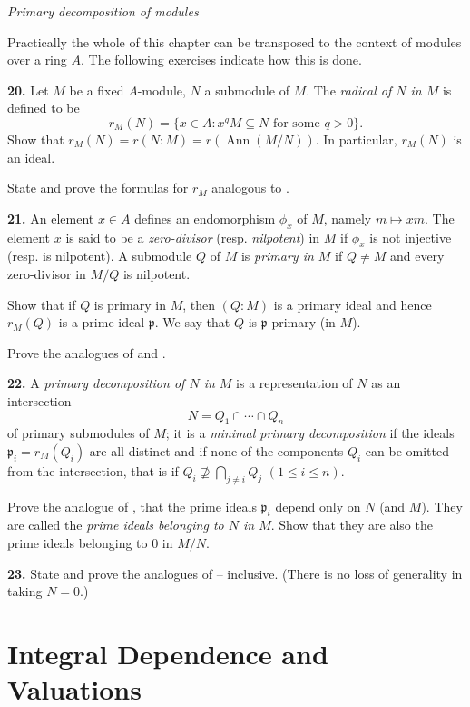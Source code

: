 \medskip
\noindent\emph{Primary decomposition of modules}

Practically the whole of this chapter can be transposed to the context of
modules over a ring $A$.  The following exercises indicate how this is done.

\medskip
\noindent\textbf{20.} Let $M$ be a fixed $A$-module, $N$ a submodule of $M$.  The \emph{radical of $N$ in $M$} is
defined to be
\[
r_M(N)=\{x\in A:x^qM\subseteq N\text{ for some }q>0\}.
\]
Show that $r_M(N)=r(N:M)=r(\operatorname{Ann}(M/N))$.  In particular, $r_M(N)$ is an
ideal.

State and prove the formulas for $r_M$ analogous to .

\medskip
\noindent\textbf{21.} An element $x\in A$ defines an endomorphism $\phi_x$ of $M$, namely $m\longmapsto xm$.  The
element $x$ is said to be a \emph{zero-divisor} (resp. \emph{nilpotent}) in $M$ if $\phi_x$ is not injective
(resp. is nilpotent).  A submodule $Q$ of $M$ is \emph{primary in $M$} if $Q\ne M$ and every
zero-divisor in $M/Q$ is nilpotent.

Show that if $Q$ is primary in $M$, then $(Q:M)$ is a primary ideal and hence
$r_M(Q)$ is a prime ideal $\mathfrak p$.  We say that $Q$ is $\mathfrak p$-primary (in $M$).

Prove the analogues of  and .

\medskip
\noindent\amstar\textbf{22.} A \emph{primary decomposition of $N$ in $M$} is a representation of $N$ as an intersection
\[
N=Q_1\cap\cdots\cap Q_n
\]
of primary submodules of $M$; it is a \emph{minimal primary decomposition} if the ideals
$\mathfrak p_i=r_M(Q_i)$ are all distinct and if none of the components $Q_i$ can be omitted
from the intersection, that is if $Q_i\nsupseteq\bigcap_{j\ne i}Q_j$ $(1\leq i\leq n)$.

Prove the analogue of , that the prime ideals $\mathfrak p_i$ depend only on $N$
(and $M$).  They are called the \emph{prime ideals belonging to $N$ in $M$}.  Show that they
are also the prime ideals belonging to 0 in $M/N$.

\medskip
\noindent\textbf{23.} State and prove the analogues of -- inclusive.  (There is no loss of
generality in taking $N=0$.)

\section{Integral Dependence and Valuations}

